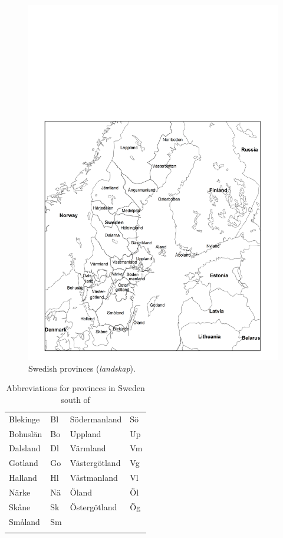 \begin{figure}[h]

\includegraphics[height=.5\textheight]{figures/5_SwedishProvinces}
\caption{Swedish provinces (\textit{landskap}).}
\label{map:4}

\end{figure}

\begin{table}

\caption{Abbreviations for provinces in Sweden south of}

\begin{tabular}{llll}
 \lsptoprule
Blekinge & Bl & Södermanland & Sö
\\
Bohuslän & Bo & Uppland & Up
\\
Dalsland & Dl & Värmland & Vm
\\
Gotland & Go & Västergötland & Vg
\\
Halland & Hl & Västmanland & Vl
\\
Närke & Nä & Öland & Öl
\\
Skåne & Sk & Östergötland & Ög
\\
Småland & Sm& & 
\\
\lspbottomrule
\end{tabular}
\end{table}

